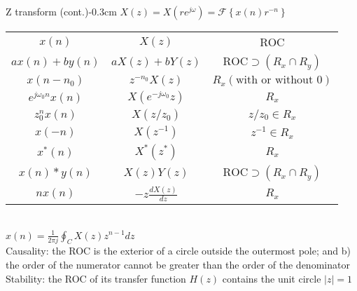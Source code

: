 \documentclass[10pt,3col]{cheatsheet}
\begin{document}
\begin{multicols*}{3}
\begin{cheatsheetbox}{Z transform (cont.)}{-0.3cm}
	$X(z) = X(re^{j\omega}) = \mathcal{F}\left\{x(n)r^{-n}\right\}$\\
    \begin{tabular}{c c c}
        $x(n)$ & $X(z)$ & ROC \\
	    $ax(n) + by(n)$ & $aX(z) + bY(z)$ & $\mathrm{ROC} \supset (R_x \cap R_y)$\\
        $x(n - n_0)$ & $z^{-n_0}X(z)$ & $R_x (\text{with or without } 0)$\\
        $e^{j\omega_0 n}x(n)$ & $X(e^{-j\omega_0}z)$ & $R_x$\\
        $z_0^nx(n)$ & $X(z/z_0)$ & $z/z_0 \in R_x$\\
        $x(-n)$ & $X(z^{-1})$ & $z^{-1} \in R_x$\\
        $x^\ast(n)$ & $X^\ast(z^\ast)$ & $R_x$\\
        $x(n) \ast y(n)$ & $X(z)Y(z)$ & $\mathrm{ROC} \supset (R_x \cap R_y)$\\
        $nx(n)$ & $-z\frac{dX(z)}{dz}$ & $R_x$\\
	\end{tabular} \\
    $x(n) = \frac{1}{2\pi j}\oint_C X(z)z^{n-1}dz$\\
    Causality: the ROC is the exterior of a circle outside the outermost pole; and b) the order of the numerator cannot be greater than the order of the denominator \\
    Stability: the ROC of its transfer function $H(z)$ contains the unit circle $|z| = 1$\\
\end{cheatsheetbox}


\end{multicols*}
\end{document}
